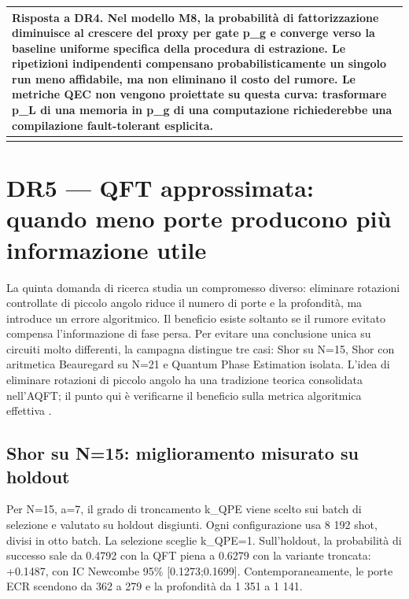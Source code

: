 {\def\LTcaptype{none} %
\begin{longtable}[]{@{}
  >{\raggedright\arraybackslash}p{}@{}}
\toprule\noalign{}
\begin{minipage}[b]{\linewidth}\raggedright
\textbf{Risposta a DR4.} Nel modello M8, la probabilità di fattorizzazione diminuisce al crescere del proxy per gate p\_g e converge verso la baseline uniforme specifica della procedura di estrazione. Le ripetizioni indipendenti compensano probabilisticamente un singolo run meno affidabile, ma non eliminano il costo del rumore. Le metriche QEC non vengono proiettate su questa curva: trasformare p\_L di una memoria in p\_g di una computazione richiederebbe una compilazione fault-tolerant esplicita.
\end{minipage} \\
\midrule\noalign{}
\endhead
\bottomrule\noalign{}
\endlastfoot
\end{longtable}
}

\section{DR5 --- QFT approssimata: quando meno porte producono più informazione utile}\label{sec:finale_5_5}\label{sec:qft_topologia}

La quinta domanda di ricerca studia un compromesso diverso: eliminare rotazioni controllate di piccolo angolo riduce il numero di porte e la profondità, ma introduce un errore algoritmico. Il beneficio esiste soltanto se il rumore evitato compensa l'informazione di fase persa. Per evitare una conclusione unica su circuiti molto differenti, la campagna distingue tre casi: Shor su N=15, Shor con aritmetica Beauregard su N=21 e Quantum Phase Estimation isolata. L'idea di eliminare rotazioni di piccolo angolo ha una tradizione teorica consolidata nell'AQFT; il punto qui è verificarne il beneficio sulla metrica algoritmica effettiva \cite{barencoAQFT1996,akoramurthy2026}.

\subsection{Shor su N=15: miglioramento misurato su holdout}\label{sec:finale_5_5_1}

Per N=15, a=7, il grado di troncamento k\_QPE viene scelto sui batch di selezione e valutato su holdout disgiunti. Ogni configurazione usa 8 192 shot, divisi in otto batch. La selezione sceglie k\_QPE=1. Sull'holdout, la probabilità di successo sale da 0.4792 con la QFT piena a 0.6279 con la variante troncata: +0.1487, con IC Newcombe 95\% {[}0.1273;0.1699{]}. Contemporaneamente, le porte ECR scendono da 362 a 279 e la profondità da 1 351 a 1 141.

